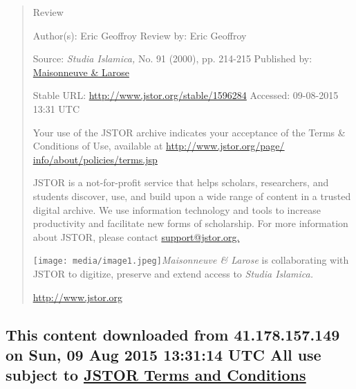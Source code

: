 \begin{quote}
Review

Author(s): Eric Geoffroy Review by: Eric Geoffroy

Source: \emph{Studia Islamica,} No. 91 (2000), pp. 214-215 Published by:
\href{http://www.jstor.org/action/showPublisher?publisherCode=mal}{Maisonneuve
\& Larose}

Stable URL: \url{http://www.jstor.org/stable/1596284} Accessed:
09-08-2015 13:31 UTC

Your use of the JSTOR archive indicates your acceptance of the Terms \&
Conditions of Use, available at
\href{http://www.jstor.org/page/info/about/policies/terms.jsp}{\underline{http://www.jstor.org/page/}}
\href{http://www.jstor.org/page/info/about/policies/terms.jsp}{\underline{info/about/policies/terms.jsp}}

JSTOR is a not-for-profit service that helps scholars, researchers, and
students discover, use, and build upon a wide range of content in a
trusted digital archive. We use information technology and tools to
increase productivity and facilitate new forms of scholarship. For more
information about JSTOR, please contact
\href{mailto:support@jstor.org}{support@jstor.org.}

\texttt{[image: media/image1.jpeg]}\emph{Maisonneuve
\& Larose} is collaborating with JSTOR to digitize, preserve and extend
access to \emph{Studia Islamica.}

\href{http://www.jstor.org/}{\underline{http://www.jstor.org}}
\end{quote}

\hypertarget{this-content-downloaded-from-41.178.157.149-on-sun-09-aug-2015-133114-utc-all-use-subject-to-jstor-terms-and-conditions}{%
\subsection{\texorpdfstring{This content downloaded from 41.178.157.149
on Sun, 09 Aug 2015 13:31:14 UTC All use subject to
\href{http://www.jstor.org/page/info/about/policies/terms.jsp}{\underline{JSTOR
Terms and
Conditions}}}{This content downloaded from 41.178.157.149 on Sun, 09 Aug 2015 13:31:14 UTC All use subject to JSTOR Terms and Conditions}}\label{this-content-downloaded-from-41.178.157.149-on-sun-09-aug-2015-133114-utc-all-use-subject-to-jstor-terms-and-conditions}}

